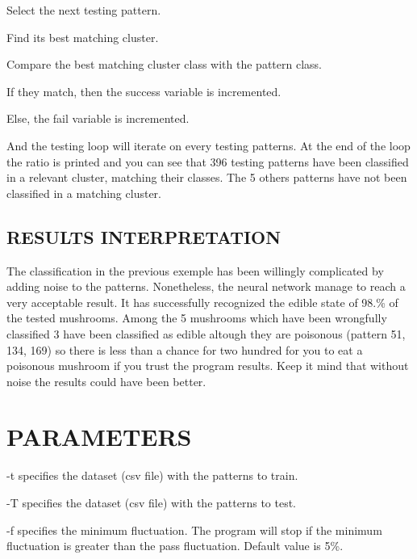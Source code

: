 \begin{DoxyItemize}
\item Select the next testing pattern.
\item Find its best matching cluster.
\item Compare the best matching cluster class with the pattern class.
\begin{DoxyItemize}
\item If they match, then the success variable is incremented.
\item Else, the fail variable is incremented.
\end{DoxyItemize}
\end{DoxyItemize}

And the testing loop will iterate on every testing patterns. At the end of the loop the ratio is printed and you can see that 396 testing patterns have been classified in a relevant cluster, matching their classes. The 5 others patterns have not been classified in a matching cluster.

\subsection*{R\-E\-S\-U\-L\-T\-S I\-N\-T\-E\-R\-P\-R\-E\-T\-A\-T\-I\-O\-N }

The classification in the previous exemple has been willingly complicated by adding noise to the patterns. Nonetheless, the neural network manage to reach a very acceptable result. It has successfully recognized the edible state of 98.\% of the tested mushrooms. Among the 5 mushrooms which have been wrongfully classified 3 have been classified as edible altough they are poisonous (pattern 51, 134, 169) so there is less than a chance for two hundred for you to eat a poisonous mushroom if you trust the program results. Keep it mind that without noise the results could have been better.

\section*{P\-A\-R\-A\-M\-E\-T\-E\-R\-S }

-\/t specifies the dataset (csv file) with the patterns to train.

-\/\-T specifies the dataset (csv file) with the patterns to test.

-\/f specifies the minimum fluctuation. The program will stop if the minimum fluctuation is greater than the pass fluctuation. Default value is 5\%.

